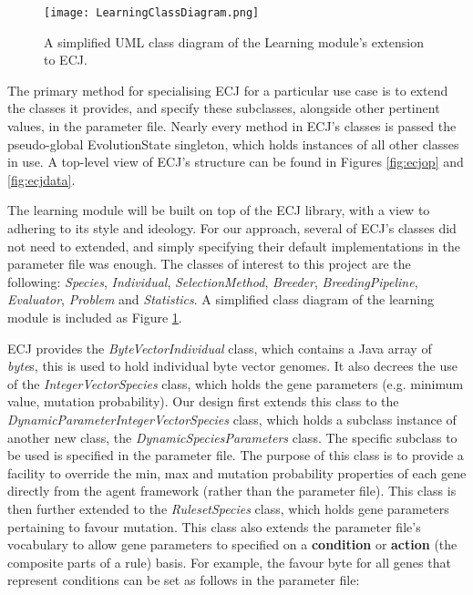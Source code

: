 \begin{figure}[t]
	\centering
	\texttt{[image: LearningClassDiagram.png]}
	\caption{A simplified UML class diagram of the Learning module's extension to ECJ.}
	\label{fig:lucl}
\end{figure}


The primary method for specialising ECJ for a particular use case is to extend the classes it provides, and specify these subclasses, alongside other pertinent values, in the parameter file. Nearly every method in ECJ's classes is passed the pseudo-global EvolutionState singleton, which holds instances of all other classes in use. A top-level view of ECJ's structure can be found in Figures \ref{fig:ecjop} and \ref{fig:ecjdata}.

The learning module will be built on top of the ECJ library, with a view to adhering to its style and ideology. For our approach, several of ECJ's classes did not need to extended, and simply specifying their default implementations in the parameter file was enough. The classes of interest to this project are the following: \emph{Species}, \emph{Individual}, \emph{SelectionMethod}, \emph{Breeder}, \emph{BreedingPipeline}, \emph{Evaluator}, \emph{Problem} and \emph{Statistics}. A simplified class diagram of the learning module is included as Figure \ref{fig:lucl}.

ECJ provides the \emph{ByteVectorIndividual} class, which contains a Java array of \emph{byte}s, this is used to hold individual byte vector genomes. It also decrees the use of the \emph{IntegerVectorSpecies} class, which holds the gene parameters (e.g. minimum value, mutation probability). Our design first extends this class to the \emph{DynamicParameterIntegerVectorSpecies} class, which holds a subclass instance of another new class, the \emph{DynamicSpeciesParameters} class. The specific subclass to be used is specified in the parameter file. The purpose of this class is to provide a facility to override the min, max and mutation probability properties of each gene directly from the agent framework (rather than the parameter file). This class is then further extended to the \emph{RulesetSpecies} class, which holds gene parameters pertaining to favour mutation. This class also extends the parameter file's vocabulary to allow gene parameters to specified on a \textbf{condition} or \textbf{action} (the composite parts of a rule) basis. For example, the favour byte for all genes that represent conditions can be set as follows in the parameter file:

